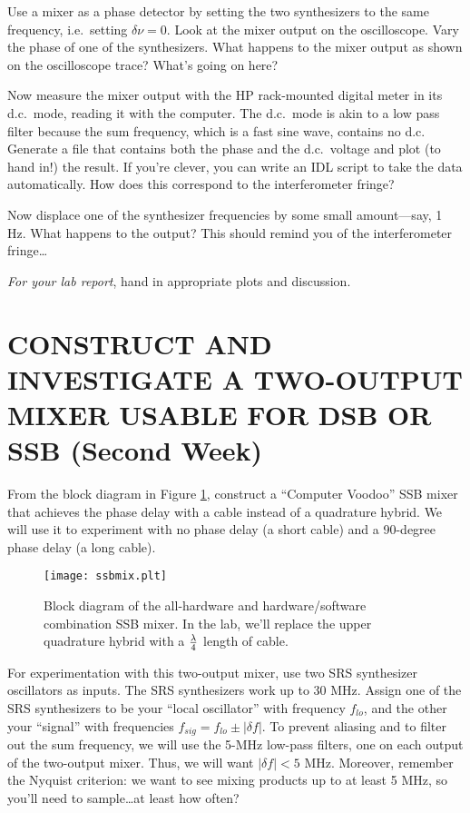 \documentclass[11pt,preprint]{aastex}
\begin{document}
        Use a mixer as a phase detector by setting the two synthesizers
to the same frequency, i.e.\ setting $\delta \nu = 0$.  Look at the
mixer output on the oscilloscope.  Vary the phase of one of the
synthesizers.  What happens to the mixer output as shown on the
oscilloscope trace? What's going on here?

Now measure the mixer output with the HP rack-mounted digital meter in
its d.c.\ mode, reading it with the computer.  The d.c.\ mode is akin to
a low pass filter because the sum frequency, which is a fast sine
wave, contains no d.c.  Generate a file that contains both the phase and
the d.c.\ voltage and plot (to hand in!) the result.  If you're clever,
you can write an IDL script to take the data automatically.  How does
this correspond to the interferometer fringe?

        Now displace one of the synthesizer frequencies by some small
amount---say, 1 Hz. What happens to the output? This should remind you
of the interferometer fringe\dots

        {\it For your lab report}, hand in appropriate plots and discussion.

\section{ CONSTRUCT AND INVESTIGATE A TWO-OUTPUT MIXER USABLE FOR DSB OR
  SSB (Second Week)}
\label{upperlowerssb}

From the block diagram in Figure \ref{ssbmfig}, construct a ``Computer
Voodoo'' SSB mixer that achieves the phase delay with a cable instead of
a quadrature hybrid. We will use it to experiment with no phase delay (a
short cable) and a 90-degree phase delay (a long cable).

\begin{figure}[ht]
        \begin{center}
        \leavevmode
        \texttt{[image: ssbmix.plt]}
        \end{center}
        \caption{Block diagram of the all-hardware and
                hardware/software combination SSB mixer. In the lab,
                we'll replace the upper quadrature hybrid with a
                $\lambda \over 4$ length of cable.}\label{ssbmfig}
\end{figure}

For experimentation with this two-output mixer, use two SRS synthesizer
oscillators as inputs.  The SRS synthesizers work up to 30 MHz.  Assign
one of the SRS synthesizers to be your ``local oscillator'' with
frequency $f_{lo}$, and the other your ``signal'' with frequencies
$f_{sig} = f_{lo} \pm |\delta f|$.  To prevent aliasing and to filter
out the sum frequency, we will use the 5-MHz low-pass filters, one on
each output of the two-output mixer. Thus, we will want $|\delta f| < 5$
MHz. Moreover, remember the Nyquist criterion: we want to see mixing
products up to at least 5 MHz, so you'll need to sample\dots at least
how often?
\end{document}
